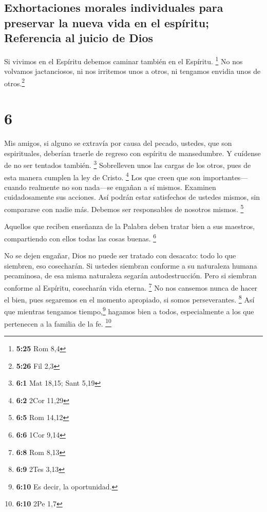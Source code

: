 \hypertarget{exhortaciones-morales-individuales-para-preservar-la-nueva-vida-en-el-espuxedritu-referencia-al-juicio-de-dios}{%
\subsection{Exhortaciones morales individuales para preservar la nueva
vida en el espíritu; Referencia al juicio de
Dios}\label{exhortaciones-morales-individuales-para-preservar-la-nueva-vida-en-el-espuxedritu-referencia-al-juicio-de-dios}}

 Si vivimos en el Espíritu debemos caminar también en el
Espíritu. \footnote{\textbf{5:25} Rom 8,4}  No nos
volvamos jactanciosos, ni nos irritemos unos a otros, ni tengamos
envidia unos de otros.\footnote{\textbf{5:26} Fil 2,3}

\hypertarget{section-5}{%
\section{6}\label{section-5}}

 Mis amigos, si alguno se extravía por causa del pecado,
ustedes, que son espirituales, deberían traerle de regreso con espíritu
de mansedumbre. Y cuídense de no ser tentados también. \footnote{\textbf{6:1}
  Mat 18,15; Sant 5,19}  Sobrelleven unos las cargas de
los otros, pues de esta manera cumplen la ley de Cristo. \footnote{\textbf{6:2}
  2Cor 11,29}  Los que creen que son importantes---cuando
realmente no son nada---se engañan a sí mismos.  Examinen
cuidadosamente sus acciones. Así podrán estar satisfechos de ustedes
mismos, sin compararse con nadie más.  Debemos ser
responsables de nosotros mismos. \footnote{\textbf{6:5} Rom 14,12}

 Aquellos que reciben enseñanza de la Palabra deben tratar
bien a sus maestros, compartiendo con ellos todas las cosas buenas.
\footnote{\textbf{6:6} 1Cor 9,14}

 No se dejen engañar, Dios no puede ser tratado con
desacato: todo lo que siembren, eso cosecharán.  Si
ustedes siembran conforme a su naturaleza humana pecaminosa, de esa
misma naturaleza segarán autodestrucción. Pero si siembran conforme al
Espíritu, cosecharán vida eterna. \footnote{\textbf{6:8} Rom 8,13}
 No nos cansemos nunca de hacer el bien, pues segaremos en
el momento apropiado, si somos perseverantes. \footnote{\textbf{6:9}
  2Tes 3,13}  Así que mientras tengamos
tiempo,\footnote{\textbf{6:10} Es decir, la oportunidad.} hagamos bien a
todos, especialmente a los que pertenecen a la familia de la fe.
\footnote{\textbf{6:10} 2Pe 1,7}

